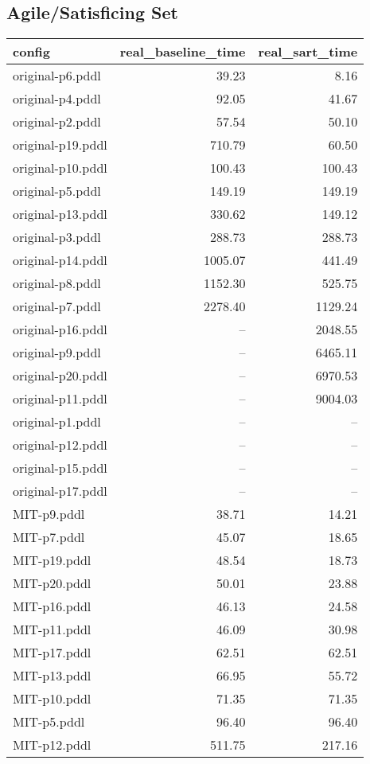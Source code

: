 \documentclass{article}
\begin{document}
                    \subsection*{Agile/Satisficing Set}
                    
                            \begin{center}
                            \scriptsize
                            \begin{tabular}{@{}l|r|r@{}}
                            config & real\_baseline\_time & real\_sart\_time\\\midrule
                             original-p6.pddl&39.23&8.16\\
 original-p4.pddl&92.05&41.67\\
 original-p2.pddl&57.54&50.10\\
 original-p19.pddl&710.79&60.50\\
 original-p10.pddl&100.43&100.43\\
 original-p5.pddl&149.19&149.19\\
 original-p13.pddl&330.62&149.12\\
 original-p3.pddl&288.73&288.73\\
 original-p14.pddl&1005.07&441.49\\
 original-p8.pddl&1152.30&525.75\\
 original-p7.pddl&2278.40&1129.24\\
 original-p16.pddl&--&2048.55\\
 original-p9.pddl&--&6465.11\\
 original-p20.pddl&--&6970.53\\
 original-p11.pddl&--&9004.03\\
 original-p1.pddl&--&--\\
 original-p12.pddl&--&--\\
 original-p15.pddl&--&--\\
 original-p17.pddl&--&--\\
 MIT-p9.pddl&38.71&14.21\\
 MIT-p7.pddl&45.07&18.65\\
 MIT-p19.pddl&48.54&18.73\\
 MIT-p20.pddl&50.01&23.88\\
 MIT-p16.pddl&46.13&24.58\\
 MIT-p11.pddl&46.09&30.98\\
 MIT-p17.pddl&62.51&62.51\\
 MIT-p13.pddl&66.95&55.72\\
 MIT-p10.pddl&71.35&71.35\\
 MIT-p5.pddl&96.40&96.40\\
 MIT-p12.pddl&511.75&217.16
                            \end{tabular}
                            \end{center}
                    
\end{document}
